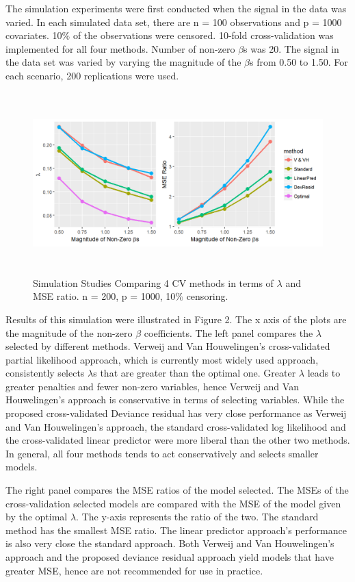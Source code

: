    The simulation experiments were first conducted when the signal in the data was varied. In each simulated data set, there are n = 100 observations and p = 1000 covariates. 10$\%$ of the observations were censored. 10-fold cross-validation was implemented for all four methods. Number of non-zero $\beta$s was 20. The signal in the data set was varied by varying the magnitude of the $\beta$s from 0.50 to 1.50. For each scenario, 200 replications were used.
   
\begin{figure}[h]
    \centering
		\includegraphics[height= 7cm ]{./figures/figure_2.png}
    \caption{Simulation Studies Comparing 4 CV methods in terms of $\lambda$ and MSE ratio. n = 200, p = 1000, 10$\%$ censoring.}
\end{figure}	

\par Results of this simulation were illustrated in Figure 2.  The x axis of the plots are the magnitude of the non-zero $\beta$ coefficients. The left panel compares the $\lambda$ selected by different methods. Verweij and Van Houwelingen's cross-validated partial likelihood approach, which is currently most widely used approach, consistently selects $\lambda$s that are greater than the optimal one.  Greater $\lambda$ leads to greater penalties and fewer non-zero variables, hence Verweij and Van Houwelingen's approach is conservative in terms of selecting variables. While the proposed cross-validated Deviance residual has very close performance as Verweij and Van Houwelingen's approach, the standard cross-validated log likelihood and the cross-validated linear predictor were more liberal than the other two methods. In general, all four methods tends to act conservatively and selects smaller models. 

\par The right panel compares the MSE ratios of the model selected. The MSEs of the cross-validation selected models are compared with the MSE of the model given by the optimal $\lambda$. The y-axis represents the ratio of the two. The standard method has the smallest MSE ratio. The linear predictor approach's performance is also very close the standard approach. Both Verweij and Van Houwelingen's approach and the proposed deviance residual approach yield models that have greater MSE, hence are not recommended for use in practice.
 
